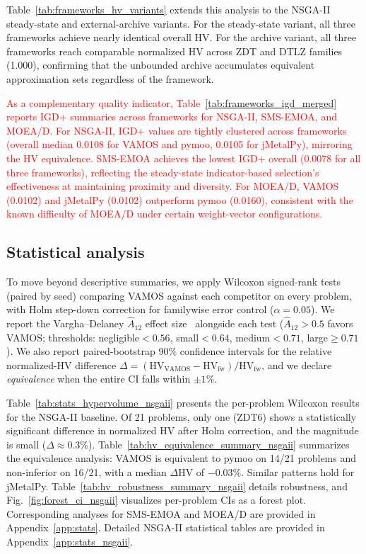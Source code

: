 \documentclass[journal]{IEEEtran}
\newcommand{\VAMOS}{VAMOS}
\newcommand{\HV}{\mathrm{HV}}
\begin{document}
Table~\ref{tab:frameworks_hv_variants} extends this analysis to the NSGA-II steady-state and external-archive variants. For the steady-state variant, all three frameworks achieve nearly identical overall HV. For the archive variant, all three frameworks reach comparable normalized HV across ZDT and DTLZ families (1.000), confirming that the unbounded archive accumulates equivalent approximation sets regardless of the framework.



\textcolor{red}{As a complementary quality indicator, Table~\ref{tab:frameworks_igd_merged} reports IGD+ summaries across frameworks for NSGA-II, SMS-EMOA, and MOEA/D. For NSGA-II, IGD+ values are tightly clustered across frameworks (overall median 0.0108 for \VAMOS{} and pymoo, 0.0105 for jMetalPy), mirroring the HV equivalence. SMS-EMOA achieves the lowest IGD+ overall (0.0078 for all three frameworks), reflecting the steady-state indicator-based selection's effectiveness at maintaining proximity and diversity. For MOEA/D, \VAMOS{} (0.0102) and jMetalPy (0.0102) outperform pymoo (0.0160), consistent with the known difficulty of MOEA/D under certain weight-vector configurations.}



\subsection{Statistical analysis}
\label{sec:stats}

To move beyond descriptive summaries, we apply Wilcoxon signed-rank tests (paired by seed) comparing VAMOS against each competitor on every problem, with Holm step-down correction for familywise error control ($\alpha=0.05$). We report the Vargha--Delaney $\hat{A}_{12}$ effect size~\cite{VD00} alongside each test ($\hat{A}_{12}>0.5$ favors VAMOS; thresholds: negligible${}<0.56$, small${}<0.64$, medium${}<0.71$, large${\ge}0.71$). We also report paired-bootstrap 90\% confidence intervals for the relative normalized-HV difference $\Delta = (\HV_{\text{VAMOS}} - \HV_{\text{fw}})/\HV_{\text{fw}}$, and we declare \emph{equivalence} when the entire CI falls within $\pm 1\%$.

Table~\ref{tab:stats_hypervolume_nsgaii} presents the per-problem Wilcoxon results for the NSGA-II baseline. Of 21 problems, only one (ZDT6) shows a statistically significant difference in normalized HV after Holm correction, and the magnitude is small ($\Delta \approx 0.3\%$). Table~\ref{tab:hv_equivalence_summary_nsgaii} summarizes the equivalence analysis: VAMOS is equivalent to pymoo on 14/21 problems and non-inferior on 16/21, with a median $\Delta$HV of $-0.03\%$. Similar patterns hold for jMetalPy. Table~\ref{tab:hv_robustness_summary_nsgaii} details robustness, and Fig.~\ref{fig:forest_ci_nsgaii} visualizes per-problem CIs as a forest plot. Corresponding analyses for SMS-EMOA and MOEA/D are provided in Appendix~\ref{app:stats}.
Detailed NSGA-II statistical tables are provided in Appendix~\ref{app:stats_nsgaii}.
\end{document}
